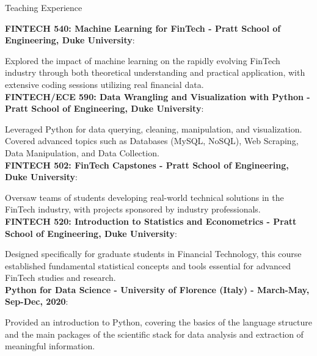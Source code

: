 \documentclass{resume} %
\begin{document}
\begin{rSection}{Teaching Experience}

\textbf{FINTECH 540: Machine Learning for FinTech - Pratt School of Engineering, Duke University}:

Explored the impact of machine learning on the rapidly evolving FinTech industry through both theoretical understanding and practical application, with extensive coding sessions utilizing real financial data.\\

\textbf{FINTECH/ECE 590: Data Wrangling and Visualization with Python - Pratt School of Engineering, Duke University}:

Leveraged Python for data querying, cleaning, manipulation, and visualization. Covered advanced topics such as Databases (MySQL, NoSQL), Web Scraping, Data Manipulation, and Data Collection.\\

\textbf{FINTECH 502: FinTech Capstones - Pratt School of Engineering, Duke University}:

Oversaw teams of students developing real-world technical solutions in the FinTech industry, with projects sponsored by industry professionals.\\

\textbf{FINTECH 520: Introduction to Statistics and Econometrics - Pratt School of Engineering, Duke University}:

Designed specifically for graduate students in Financial Technology, this course established fundamental statistical concepts and tools essential for advanced FinTech studies and research.\\

\textbf{Python for Data Science - University of Florence (Italy) - March-May, Sep-Dec, 2020}:

Provided an introduction to Python, covering the basics of the language structure and the main packages of the scientific stack for data analysis and extraction of meaningful information.\\

\end{rSection}
\end{document}
